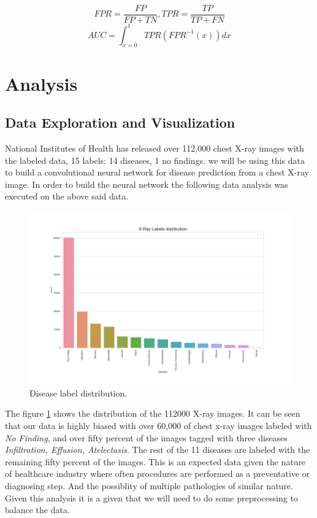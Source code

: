 \documentclass{article}
\begin{document}
    \begin{equation}
        FPR = \frac{FP}{FP + TN}, TPR = \frac{TP}{TP + FN}
    \end{equation}
    \begin{equation}
            AUC = \int_{x=0}^{1} TPR(FPR^{-1}(x))dx
    \end{equation}

    \section{Analysis}
    \subsection{Data Exploration and Visualization}
    National Institutes of Health has released over 112,000 chest X-ray images with the labeled data, 15 labels: 14 diseases, 1 no findings.\cite{nih-gov-xray-release} we will be using this data to build a convolutional neural network for disease prediction from a chest X-ray image. In order to build the neural network the following data analysis was executed on the above said data.

    \begin{figure}
        \includegraphics[width=\linewidth]{./images/labels_distribution.jpg}
        \caption{Disease label distribution.}
        \label{fig:labels-distribution}
    \end{figure}
    
    The figure \ref{fig:labels-distribution} shows the distribution of the 112000 X-ray images. It can be seen that our data is highly biased with over 60,000 of chest x-ray images labeled with \textit{No Finding}, and over fifty percent of the images tagged with three diseases \textit{Infiltration, Effusion, Atelectasis}. The rest of the 11 diseases are labeled with the remaining fifty percent of the images. This is an expected data given the nature of healthcare industry where often procedures are performed as a preventative or diagnosing step. And the possiblity of multiple pathologies of similar nature. Given this analysis it is a given that we will need to do some preprocessing to balance the data.
\end{document}
